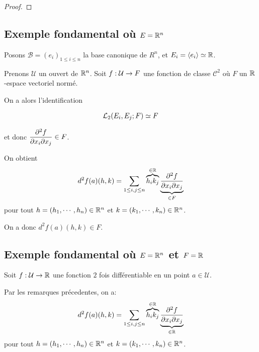 \ifdefined\outputproof
\begin{proof}

\end{proof}
\fi

\subsection{Exemple fondamental où $E = \real^{n}$}

Posons $\mathcal{B} = (e_{i})_{1 \leq i \leq n}$ la base canonique de $R^{n}$,
et $E_{i} = \spanspace{e_{i}} \isomorphe \real$.

Prenons $\mathcal{U}$ un ouvert de $\real^{n}$.
Soit $\GSfunction{f}{\mathcal{U}}{F}$ une fonction de classe $\mathcal{C}^{2}$ où
$F$ un $\real$-espace vectoriel normé.

On a alors l'identification

\begin{align*}
	\GScontinueHomo[2]{E_{i}, E_{j}}{F} \identification F
\end{align*}

et donc $ \displaystyle \pdv{f}{x_{i}}{x_{j}} (a) \in F$.

On obtient
\begin{equation*}
	d^{2}f(a) (h, k) = \displaystyle \sum_{1 \leq i, j \leq n} \overbrace{h_{i} k_{j}}^{\in
	\real} \underbrace{\pdv{f}{x_{i}}{x_{j}} (a)}_{\in F}
\end{equation*}
pour tout $h = (h_{1}, \cdots, h_{n}) \in \real^{n}$ et $k = (k_{1}, \cdots,
k_{n}) \in \real^{n}$.

On a donc $\displaystyle d^{2}f(a)(h, k) \in F$.



\subsection{Exemple fondamental où $E = \real^{n}$ et $F = \real$}

Soit $\GSfunction{f}{\mathcal{U}}{\real}$ une fonction $2$ fois différentiable
en un point $a \in \mathcal{U}$.

Par les remarques précedentes, on a:
\begin{equation*}
	d^{2}f(a) (h, k) = \displaystyle \sum_{1 \leq i, j \leq n} \overbrace{h_{i} k_{j}}^{\in
	\real} \underbrace{\pdv{f}{x_{i}}{x_{j}} (a)}_{\in \real}
\end{equation*}
pour tout $h = (h_{1}, \cdots, h_{n}) \in \real^{n}$ et $k = (k_{1}, \cdots,
k_{n}) \in \real^{n}$.

